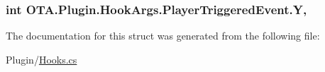 \subsubsection[{Y}]{\setlength{\rightskip}{0pt plus 5cm}int O\+T\+A.\+Plugin.\+Hook\+Args.\+Player\+Triggered\+Event.\+Y\hspace{0.3cm}{\ttfamily [get]}, {\ttfamily [set]}}\label{struct_o_t_a_1_1_plugin_1_1_hook_args_1_1_player_triggered_event_ad1a1ac56965245076ba84ab3a1f1b566}


The documentation for this struct was generated from the following file\+:\begin{DoxyCompactItemize}
\item 
Plugin/\hyperlink{_hooks_8cs}{Hooks.\+cs}\end{DoxyCompactItemize}
